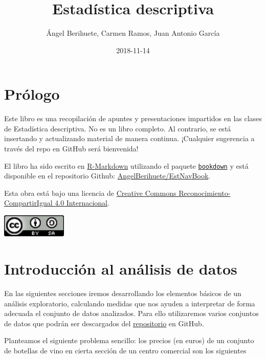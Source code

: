\documentclass[]{book}
\title{Estadística descriptiva}
\author{Ángel Berihuete, Carmen Ramos, Juan Antonio García}
\date{2018-11-14}
\theoremstyle{definition}
\theoremstyle{definition}
\theoremstyle{definition}
\theoremstyle{remark}
\begin{document}
\maketitle

{
\setcounter{tocdepth}{1}
\tableofcontents
}
\chapter*{Prólogo}\label{prologo}

Este libro es una recopilación de apuntes y presentaciones impartidos en
las clases de Estadística descriptiva. No es un libro completo. Al
contrario, se está insertando y actualizando material de manera
continua. ¡Cualquier sugerencia a través del repo en GitHub será
bienvenida!

El libro ha sido escrito en
\href{http://rmarkdown.rstudio.com}{R-Markdown} utilizando el paquete
\href{https://bookdown.org/yihui/bookdown/}{\texttt{bookdown}} y está
disponible en el repositorio Github:
\href{https://github.com/AngelBerihuete/EstNavBook}{AngelBerihuete/EstNavBook}.

Esta obra está bajo una licencia de
\href{https://creativecommons.org/licenses/by-sa/4.0/deed.es}{Creative
Commons Reconocimiento-CompartirIgual 4.0 Internacional}.

\begin{flushleft}\includegraphics[width=1.22in]{images/by-sa-88x31} \end{flushleft}

\chapter{Introducción al análisis de datos}\label{intro}

En las siguientes secciones iremos desarrollando los elementos básicos
de un análisis exploratorio, calculando medidas que nos ayuden a
interpretar de forma adecuada el conjunto de datos analizados. Para ello
utilizaremos varios conjuntos de datos que podrán ser descargados del
\href{https://github.com/AngelBerihuete/EstNavBook/tree/master/datasets}{repositorio}
en GitHub.

Planteamos el siguiente problema sencillo: los precios (en euros) de un
conjunto de botellas de vino en cierta sección de un centro comercial
son los siguientes
\end{document}
